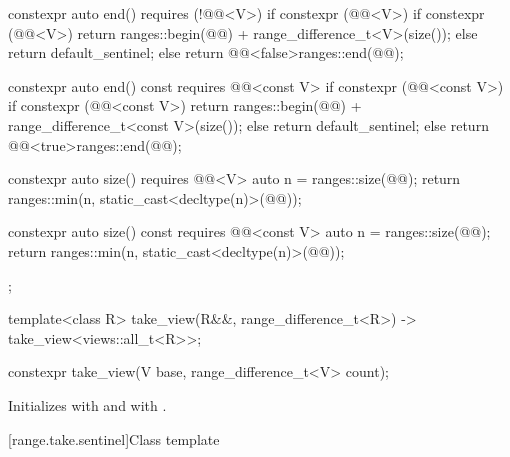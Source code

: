 \begin{codeblock}
{{    constexpr auto end() requires (!@@<V>) {
      if constexpr (@@<V>) {
        if constexpr (@@<V>)
          return ranges::begin(@@) + range_difference_t<V>(size());
        else
          return default_sentinel;
      } else {
        return @@<false>{ranges::end(@@)};
      }
    }

    constexpr auto end() const requires @@<const V> {
      if constexpr (@@<const V>) {
        if constexpr (@@<const V>)
          return ranges::begin(@@) + range_difference_t<const V>(size());
        else
          return default_sentinel;
      } else {
        return @@<true>{ranges::end(@@)};
      }
    }

    constexpr auto size() requires @@<V> {
      auto n = ranges::size(@@);
      return ranges::min(n, static_cast<decltype(n)>(@@));
    }

    constexpr auto size() const requires @@<const V> {
      auto n = ranges::size(@@);
      return ranges::min(n, static_cast<decltype(n)>(@@));
    }
  };

  template<class R>
    take_view(R&&, range_difference_t<R>)
      -> take_view<views::all_t<R>>;
}
\end{codeblock}

%
\begin{itemdecl}
constexpr take_view(V base, range_difference_t<V> count);
\end{itemdecl}

\begin{itemdescr}
\pnum
\effects
Initializes  with  and
 with .
\end{itemdescr}

[range.take.sentinel]{Class template }

